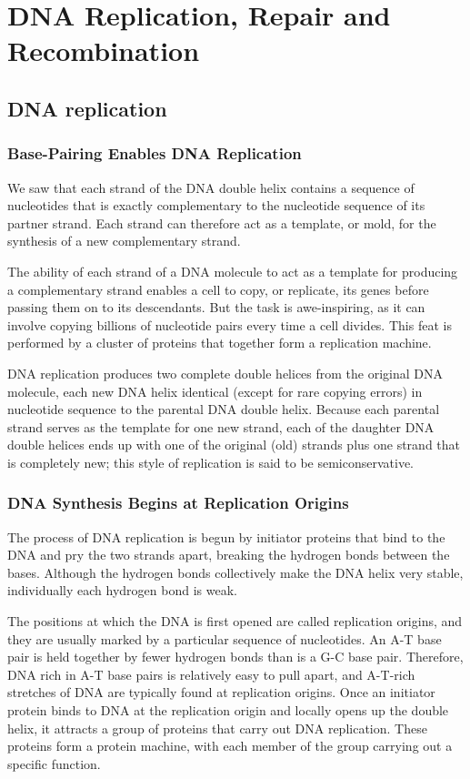 \chapter{DNA Replication, Repair and Recombination}

\section{DNA replication}

\subsection{Base-Pairing Enables DNA Replication}

We saw that each strand of the DNA double
helix contains a sequence of nucleotides that is exactly complementary to
the nucleotide sequence of its partner strand. Each strand can therefore
act as a template, or mold, for the synthesis of a new complementary
strand.

The ability of each strand of a DNA molecule to act as a template for
producing a complementary strand enables a cell to copy, or replicate,
its genes before passing them on to its descendants. But the task is awe-inspiring,
as it can involve copying billions of nucleotide pairs every time
a cell divides. This feat is performed by a cluster of proteins that together form
a replication machine.

DNA replication produces two complete double helices from the original
DNA molecule, each new DNA helix identical (except for rare copying
errors) in nucleotide sequence to the parental DNA double helix.
Because each parental strand serves as the template for one
new strand, each of the daughter DNA double helices ends up with one
of the original (old) strands plus one strand that is completely new; this
style of replication is said to be semiconservative.

\subsection{DNA Synthesis Begins at Replication Origins}

The process of DNA replication is begun by initiator proteins that bind
to the DNA and pry the two strands apart, breaking the hydrogen bonds
between the bases. Although the hydrogen bonds collectively
make the DNA helix very stable, individually each hydrogen bond is weak.

The positions at which the DNA is first opened are called replication
origins, and they are usually marked by a particular sequence of nucleotides.
An A-T base pair is held together by fewer hydrogen bonds than is a G-C base
pair. Therefore, DNA rich in A-T base pairs is relatively easy to pull apart,
and A-T-rich stretches of DNA are typically found at replication origins.
Once an initiator protein binds to DNA at the replication origin and
locally opens up the double helix, it attracts a group of proteins that carry
out DNA replication. These proteins form a protein machine, with each
member of the group carrying out a specific function.

